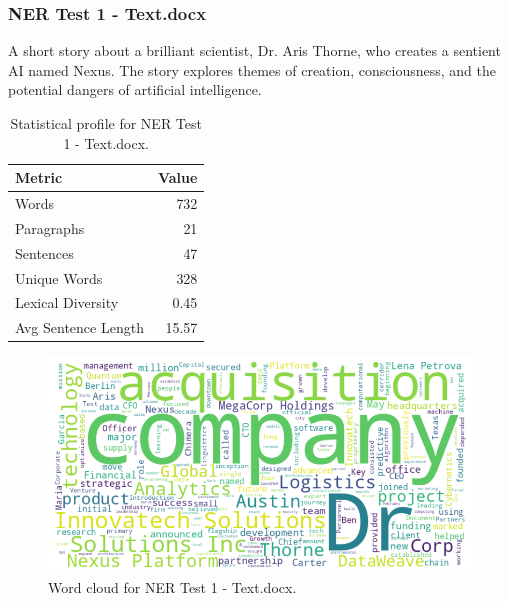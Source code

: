 \subsubsection*{NER Test 1 - Text.docx}
A short story about a brilliant scientist, Dr. Aris Thorne, who creates a sentient AI named Nexus. The story explores themes of creation, consciousness, and the potential dangers of artificial intelligence.

\begin{table}[!ht]
\centering
\begin{tabular}{lr}
\toprule
\textbf{Metric} & \textbf{Value} \\
\midrule
Words & 732 \\
Paragraphs & 21 \\
Sentences & 47 \\
Unique Words & 328 \\
Lexical Diversity & 0.45 \\
Avg Sentence Length & 15.57 \\
\bottomrule
\end{tabular}
\caption{Statistical profile for NER Test 1 - Text.docx.}
\label{tab:ner1_stats}
\end{table}

\begin{figure}[!ht]
  \centering
  \includegraphics[width=\textwidth]{figures/appendix_fig/GRP002EXP001_eda_wordcloud.png}
  \caption{Word cloud for NER Test 1 - Text.docx.}
  \label{fig:ner1_wordcloud}
\end{figure}

